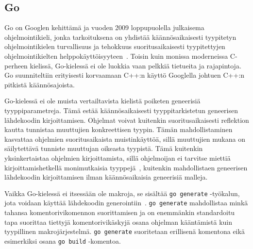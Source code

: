 \subsection{Go}

Go on Googlen kehittämä ja vuoden 2009 loppupuolella julkaisema
ohjelmointikieli, jonka tarkoituksena on yhdistää käännösaikaisesti tyypitetyn
ohjelmointikielen turvallisuus ja tehokkuus suoritusaikaisesti tyypitettyjen
ohjelmointikielten helppokäyttöisyyteen~\citep{gohistory}. Toisin kuin monissa
moderneissa C-perheen kielissä, Go-kielessä ei ole luokkia vaan pelkkiä
tietueita ja rajapintoja. Go suunniteltiin erityisesti korvaamaan C++:n käyttö
Googlella johtuen C++:n pitkistä käännösajoista.

Go-kielessä ei ole muista vertailtavista kielistä poiketen geneerisiä
tyyppiparametreja. Tämä estää käännösaikaisesti tyyppitarkistetun geneerisen
lähdekoodin kirjoittamisen. Ohjelmat voivat kuitenkin suoritusaikaisesti
reflektion kautta tunnistaa muuttujien konkreettisen tyypin. Tämän
mahdollistaminen kasvattaa ohjelmien suoritusaikaista muistinkäyttöä, sillä
muuttujien mukana on säilytettävä tunniste muuttujan oikeasta tyypistä. Tämä
kuitenkin yksinkertaistaa ohjelmien kirjoittamista, sillä ohjelmoijan ei
tarvitse miettiä kirjoittamishetkellä monimutkaisia
tyyppejä~\citep[esim.][kalvo 8]{gohistory}, kuitenkin mahdollistaen geneerisen
lähdekoodin kirjoittamisen ilman käännösaikaisia geneerisiä malleja.


Vaikka Go-kielessä ei itsessään ole makroja, se sisältää \texttt{go~generate}
-työkalun, jota voidaan käyttää lähdekoodin generointiin~\citep{gogenerate}.
\texttt{go~generate} mahdollistaa minkä tahansa komentorivikomennon suorittamisen
ja on enemmänkin standardoitu tapa suorittaa tiettyjä komentorivikäskyjä osana
ohjelman kääntämistä kuin tyypillinen makrojärjestelmä.
\texttt{\mbox{go~generate}} suoritetaan erillisenä komentona eikä esimerkiksi osana
\texttt{\mbox{go~build}} -komentoa.



